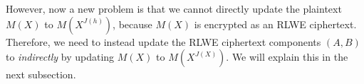 \begin{comment}
$ $

$ =  \bm{(}\text{ } M( \omega^{5^h} ), \text{ } M( \omega^{5^{1+h}}), \text{ } M( \omega^{5^{2+h}}), \cdots, \text{ } M( \omega^{5^{\frac{n}{2}-1+h}}), \text{ } M(\overline{\omega}^{5^{\frac{n}{2}-1+h}} ),  \cdots, M( \overline\omega^{5^{1+h}} ), \text{ } M( \overline\omega^{5^{h}} ) \text{ }\bm{)} $

$ $

$ =  \bm{(}\text{ } M( \omega^{5^h} ), \text{ } M( \omega^{5^{1+h}}), \text{ } M( \omega^{5^{2+h}}), \cdots, \text{ } M( \omega^{5^{h-1}}), \text{ } M(\overline{\omega}^{5^{h-1}} ),  \cdots, M( \overline\omega^{5^{1+h}} ), \text{ } M( \overline\omega^{5^{h}} ) \text{ }\bm{)} $ 

\textcolor{red}{\# since $5^{\frac{n}{2}} \bmod 2n = 1$}

$ $

Since the above vector is a Hermitian vector, we will remove its second half (i.e., conjugates of the first half) to retrieve the original input vector, which gives us the following:


$ \bm{(}\text{ } M( \omega^{5^h} ), \text{ } M( \omega^{5^{1+h}}), \text{ } M( \omega^{5^{2+h}}), \cdots, \text{ } M( \omega^{5^{\frac{n}{2}-2}}) \text{ } M( \omega^{5^{\frac{n}{2}-1}}), \text{ } M( \omega^{5^{0}}), \text{ } M( \omega^{5^{1}}), \cdots, M( \omega^{5^{h-1}}) \text{ }\bm{)} $

$ $

$ = \bm{(}\text{ } M(\omega^{J(h)}), \text{ } M(\omega^{J(h+1)}), \cdots, \text{ } M(\omega^{J(\frac{n}{2}-2)}), \text{ } M(\omega^{J(\frac{n}{2}-1)}), \text{ } M(\omega^{J(0)}), \text{ } M(\omega^{J(1)}), \cdots, \text{ } M(\omega^{J(h-1)})  \text{ }\bm{)}$

$ $

$= \vec{v}^{\langle h \rangle}$

$ $

In conclusion, given the modified encoding matrix $\hathat{W}$ and modified decoding matrix $\hathat{W}^*$, rotating all elements of the input vector $\vec{v}$ by $h$ positions to the left is equivalent to updating the plaintext polynomial $M(X)$ to $M(X^{J(h)})$. 
\end{comment}


However, now a new problem is that we cannot directly update the plaintext $M(X)$ to $M(X^{J(h)})$, because $M(X)$ is encrypted as an RLWE ciphertext. Therefore, we need to instead update the RLWE ciphertext components $(A, B)$ to \textit{indirectly} by updating $M(X)$ to $M(X^{J(X)})$. We will explain this in the next subsection. 


